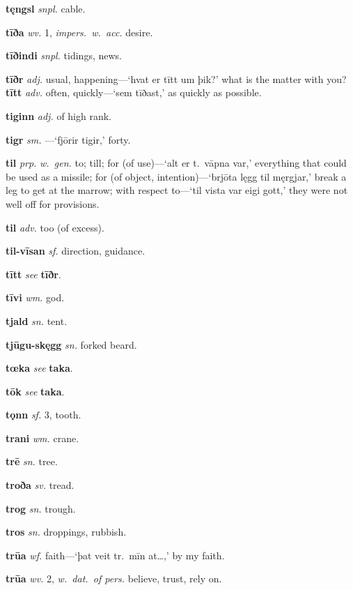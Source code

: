 \documentclass[12pt,letterpaper]{book}
\begin{document}
\noindent
\textbf{tęngsl} \textit{snpl.} cable.

\noindent
\textbf{tīða} \textit{wv.} 1, \textit{impers.\ w.\ acc.} desire.

\noindent
\textbf{tīðindi} \textit{snpl.} tidings, news.

\noindent
\textbf{tīðr} \textit{adj.} usual, happening---`hvat er tītt um þik?' what
	is the matter with you?  \textbf{tītt} \textit{adv.} often, quickly---`sem
	tīðast,' as quickly as possible.

\noindent
\textbf{tiginn} \textit{adj.} of high rank.

\noindent
\textbf{tigr} \textit{sm.} ---`fjōrir tigir,' forty.

\noindent
\textbf{til} \textit{prp.} \textit{w.\ gen.} to; till; for (of use)---`alt
	er t.\ vāpna var,' everything that could be used as a missile; for
	(of object, intention)---`brjōta lęgg til męrgjar,' break a leg to
    get at the marrow; with respect to---`til vista var eigi
    gott,' they were not well off for provisions.

\noindent
\textbf{til} \textit{adv.} too (of excess).

\noindent
\textbf{til-vīsan} \textit{sf.} direction, guidance.

\noindent
\textbf{tītt} \textit{} \textit{see} \textbf{tīðr}.

\noindent
\textbf{tīvi} \textit{wm.} god.

\noindent
\textbf{tjald} \textit{sn.} tent.

\noindent
\textbf{tjūgu-skęgg} \textit{sn.} forked beard.

\noindent
\textbf{tœka} \textit{} \textit{see} \textbf{taka}.

\noindent
\textbf{tōk} \textit{} \textit{see} \textbf{taka}.

\noindent
\textbf{tǫnn} \textit{sf.} 3, tooth.

\noindent
\textbf{trani} \textit{wm.} crane.

\noindent
\textbf{trē} \textit{sn.} tree.

\noindent
\textbf{troða} \textit{sv.} tread.

\noindent
\textbf{trog} \textit{sn.} trough.

\noindent
\textbf{tros} \textit{sn.} droppings, rubbish.

\noindent
\textbf{trūa} \textit{wf.} faith---`þat veit tr.\ mīn at\ldots,' by
	my faith.

\noindent
\textbf{trūa} \textit{wv.} 2, \textit{w.\ dat.\ of pers.} believe, trust,
	rely on.
\end{document}
